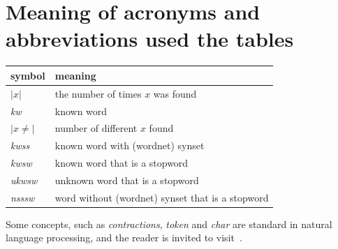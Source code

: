 \documentclass[%
 aip,
 jmp,%
 amsmath,amssymb,
 reprint,%
]{revtex4-1}
\begin{document}
\section{Meaning of acronyms and abbreviations used the tables}
\begin{table}[H]
\centering
\begin{tabular}{|p{1cm}|p{6cm}|}\hline
symbol & meaning \\\hline\hline
$|x|$ & the number of times $x$ was found \\\hline
\emph{kw} & known word \\\hline
$|x\neq|$ & number of different $x$ found \\\hline
\emph{kwss} & known word with (wordnet) synset \\\hline
\emph{kwsw} & known word that is a stopword \\\hline
\emph{ukwsw} & unknown word that is a stopword \\\hline
\emph{nsssw} & word without (wordnet) synset that is a stopword \\\hline
\end{tabular}
\end{table}

Some concepts, such as \emph{contractions}, \emph{token} and \emph{char} are standard in natural language processing, and the reader is invited to visit~\cite{nltkBook}.


\end{document}
